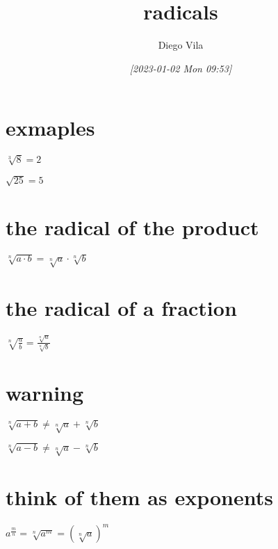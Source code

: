 \documentclass[11pt]{article}
\author{Diego Vila}
\date{\textit{[2023-01-02 Mon 09:53]}}
\title{radicals}
\begin{document}
\maketitle
\tableofcontents


\section{exmaples}
\label{sec:org4079bd2}
\(\sqrt[3]{8} = 2\)

\(\sqrt{25} = 5\)

\section{the radical of the product}
\label{sec:orgd364880}

\(\sqrt[n]{a \cdot b} = \sqrt[n]{a} \cdot \sqrt[n]{b}\)

\section{the radical of a fraction}
\label{sec:org05cbd3c}

\(\sqrt[n]{\frac{a}{b}} = \frac{\sqrt[n]{a}}{\sqrt[n]{b}}\)

\section{warning}
\label{sec:org068edfa}

\(\sqrt[n]{a + b} \neq \sqrt[n]{a} + \sqrt[n]{b}\)

\(\sqrt[n]{a - b} \neq \sqrt[n]{a} - \sqrt[n]{b}\)

\section{think of them as exponents}
\label{sec:org6fb8e7b}

\(a^{\frac{m}{n}} = \sqrt[n]{a^m} = (\sqrt[n]{a})^m\)
\end{document}
